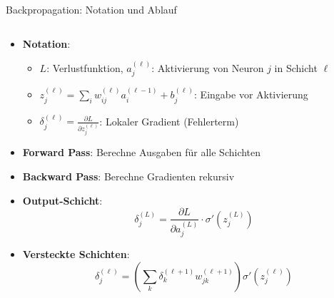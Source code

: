 \documentclass[aspectratio=1610, xcolor=dvipsnames, 9pt]{beamer}
\begin{document}
      \begin{frame}{Backpropagation: Notation und Ablauf}
        \begin{columns}
          \begin{column}{1\textwidth}
            \begin{itemize}
              \item \textbf{Notation}: 
              \begin{itemize}
                \item $L$: Verlustfunktion, $a_j^{(\ell)}$: Aktivierung von Neuron $j$ in Schicht $\ell$
                \item $z_j^{(\ell)} = \sum_i w_{ij}^{(\ell)} a_i^{(\ell-1)} + b_j^{(\ell)}$: Eingabe vor Aktivierung
                \item $\delta_j^{(\ell)} = \frac{\partial L}{\partial z_j^{(\ell)}}$: Lokaler Gradient (Fehlerterm)
              \end{itemize}
              \item \textbf{Forward Pass}: Berechne Ausgaben für alle Schichten
              \item \textbf{Backward Pass}: Berechne Gradienten rekursiv
              \item \textbf{Output-Schicht}:
              \begin{equation}
                \delta_j^{(L)} = \frac{\partial L}{\partial a_j^{(L)}} \cdot \sigma'(z_j^{(L)})
              \end{equation}
              \item \textbf{Versteckte Schichten}:
              \begin{equation}
                \delta_j^{(\ell)} = \left(\sum_{k} \delta_k^{(\ell+1)} w_{jk}^{(\ell+1)}\right) \sigma'(z_j^{(\ell)})
              \end{equation}
            \end{itemize}
          \end{column}
        \end{columns}
      \end{frame}
\end{document}
